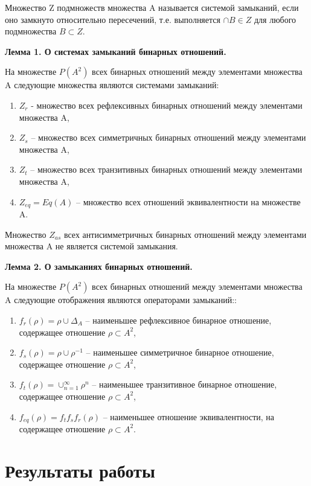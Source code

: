 \documentclass[spec, och, labwork]{shiza}
\begin{document}
Множество Z подмножеств множества A называется системой замыканий, если оно замкнуто относительно пересечений, т.е. 
выполняется $\cap B \in Z$ для любого подмножества $B \subset Z$.

\textbf{Лемма 1. О системах замыканий бинарных отношений.} 

На множестве $P(A^2)$ всех бинарных отношений между элементами множества A следующие множества являются системами замыканий:

\begin{enumerate}
    \item $Z_r$ - множество всех рефлексивных бинарных отношений между элементами множества A,
    \item $Z_s$ – множество всех симметричных бинарных отношений между элементами множества A,
    \item $Z_t$ – множество всех транзитивных бинарных отношений между элементами множества A,
    \item $Z_{eq} = Eq(A)$ – множество всех отношений эквивалентности на множестве A.
    
\end{enumerate}

Множество $Z_{as}$ всех антисимметричных бинарных отношений между элементами множества A не является системой замыкания.

\textbf{Лемма 2. О замыканиях бинарных отношений.}

На множестве $P(A^2)$ всех бинарных отношений между элементами множества A следующие отображения являются операторами замыканий::

\begin{enumerate}
    \item $f_r (\rho)=\rho \cup \Delta_A$ – наименьшее рефлексивное бинарное отношение, содержащее отношение $\rho \subset A^2$,
    \item $f_s (\rho)= \rho \cup \rho^{-1}$ – наименьшее симметричное бинарное отношение, содержащее отношение $\rho \subset A^2$,
    \item $f_t (\rho)= \cup_{n=1}^\infty \rho^n$  – наименьшее транзитивное бинарное отношение, содержащее отношение $\rho \subset A^2$,
    \item $f_{eq} (\rho)=f_t f_s f_r (\rho)$ – наименьшее отношение эквивалентности, на содержащее отношение $\rho \subset A^2$.
    
\end{enumerate}

\section{Результаты работы}
\end{document}
